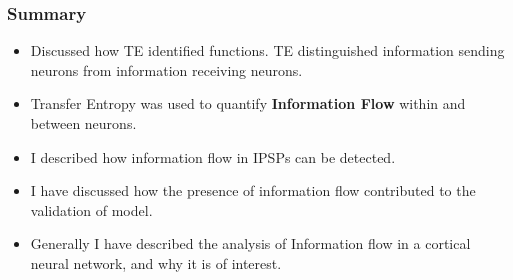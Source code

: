 \documentclass{beamer}
\begin{document}
\begin{frame}
\frametitle{\textbf{Summary}}
\begin{itemize}


\vfill\item Discussed how TE identified functions. TE distinguished information sending neurons from information receiving neurons.%

\vfill\item Transfer Entropy was used to quantify \textbf{Information Flow} within and between neurons.

\vfill \item I described how information flow in IPSPs can be detected.

\vfill\item I have discussed how the presence of information flow contributed to the validation of model. 

\vfill \item Generally I have described the analysis of Information flow in a cortical neural network, and why it is of interest.


\end{itemize}
\end{frame}






\end{document}

